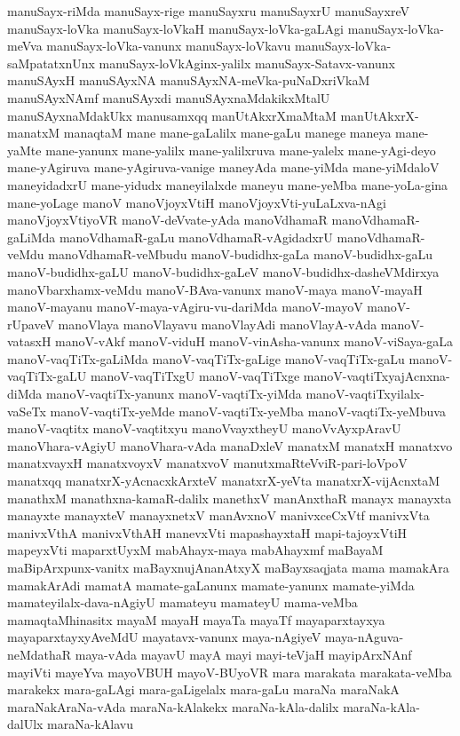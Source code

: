 {manuSayx-riMda
manuSayx-rige
manuSayxru
manuSayxrU
manuSayxreV
manuSayx-loVka
manuSayx-loVkaH
manuSayx-loVka-gaLAgi
manuSayx-loVka-meVva
manuSayx-loVka-vanunx
manuSayx-loVkavu
manuSayx-loVka-saMpatatxnUnx
manuSayx-loVkAginx-yalilx
manuSayx-Satavx-vanunx
manuSAyxH
manuSAyxNA
manuSAyxNA-meVka-puNaDxriVkaM
manuSAyxNAmf
manuSAyxdi
manuSAyxnaMdakikxMtalU
manuSAyxnaMdakUkx
manusamxqq
manUtAkxrXmaMtaM
manUtAkxrX-manatxM
manaqtaM
mane
mane-gaLalilx
mane-gaLu
manege
maneya
mane-yaMte
mane-yanunx
mane-yalilx
mane-yalilxruva
mane-yalelx
mane-yAgi-deyo
mane-yAgiruva
mane-yAgiruva-vanige
maneyAda
mane-yiMda
mane-yiMdaloV
maneyidadxrU
mane-yidudx
maneyilalxde
maneyu
mane-yeMba
mane-yoLa-gina
mane-yoLage
manoV
manoVjoyxVtiH
manoVjoyxVti-yuLaLxva-nAgi
manoVjoyxVtiyoVR
manoV-deVvate-yAda
manoVdhamaR
manoVdhamaR-gaLiMda
manoVdhamaR-gaLu
manoVdhamaR-vAgidadxrU
manoVdhamaR-veMdu
manoVdhamaR-veMbudu
manoV-budidhx-gaLa
manoV-budidhx-gaLu
manoV-budidhx-gaLU
manoV-budidhx-gaLeV
manoV-budidhx-dasheVMdirxya
manoVbarxhamx-veMdu
manoV-BAva-vanunx
manoV-maya
manoV-mayaH
manoV-mayanu
manoV-maya-vAgiru-vu-dariMda
manoV-mayoV
manoV-rUpaveV
manoVlaya
manoVlayavu
manoVlayAdi
manoVlayA-vAda
manoV-vatasxH
manoV-vAkf
manoV-viduH
manoV-vinAsha-vanunx
manoV-viSaya-gaLa
manoV-vaqTiTx-gaLiMda
manoV-vaqTiTx-gaLige
manoV-vaqTiTx-gaLu
manoV-vaqTiTx-gaLU
manoV-vaqTiTxgU
manoV-vaqTiTxge
manoV-vaqtiTxyajAcnxna-diMda
manoV-vaqtiTx-yanunx
manoV-vaqtiTx-yiMda
manoV-vaqtiTxyilalx-vaSeTx
manoV-vaqtiTx-yeMde
manoV-vaqtiTx-yeMba
manoV-vaqtiTx-yeMbuva
manoV-vaqtitx
manoV-vaqtitxyu
manoVvayxtheyU
manoVvAyxpAravU
manoVhara-vAgiyU
manoVhara-vAda
manaDxleV
manatxM
manatxH
manatxvo
manatxvayxH
manatxvoyxV
manatxvoV
manutxmaRteVviR-pari-loVpoV
manatxqq
manatxrX-yAcnacxkArxteV
manatxrX-yeVta
manatxrX-vijAcnxtaM
manathxM
manathxna-kamaR-dalilx
manethxV
manAnxthaR
manayx
manayxta
manayxte
manayxteV
manayxnetxV
manAvxnoV
manivxceCxVtf
manivxVta
manivxVthA
manivxVthAH
manevxVti
mapashayxtaH
mapi-tajoyxVtiH
mapeyxVti
maparxtUyxM
mabAhayx-maya
mabAhayxmf
maBayaM
maBipArxpunx-vanitx
maBayxnujAnanAtxyX
maBayxsaqjata
mama
mamakAra
mamakArAdi
mamatA
mamate-gaLanunx
mamate-yanunx
mamate-yiMda
mamateyilalx-dava-nAgiyU
mamateyu
mamateyU
mama-veMba
mamaqtaMhinasitx
mayaM
mayaH
mayaTa
mayaTf
mayaparxtayxya
mayaparxtayxyAveMdU
mayatavx-vanunx
maya-nAgiyeV
maya-nAguva-neMdathaR
maya-vAda
mayavU
mayA
mayi
mayi-teVjaH
mayipArxNAnf
mayiVti
mayeYva
mayoVBUH
mayoV-BUyoVR
mara
marakata
marakata-veMba
marakekx
mara-gaLAgi
mara-gaLigelalx
mara-gaLu
maraNa
maraNakA
maraNakAraNa-vAda
maraNa-kAlakekx
maraNa-kAla-dalilx
maraNa-kAla-dalUlx
maraNa-kAlavu
}
